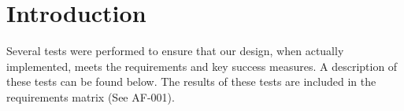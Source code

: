 \documentclass[]{auvsi_doc}
\begin{document}
\begin{AUVSITitlePage}
\begin{artifacttable}

\end{artifacttable}
\end{AUVSITitlePage}

\section{Introduction}
Several tests were performed to ensure that our design, when actually implemented, meets the requirements and key success measures. A description of these tests can be found below. The results of these tests are included in the requirements matrix (See AF-001).
\end{document}
